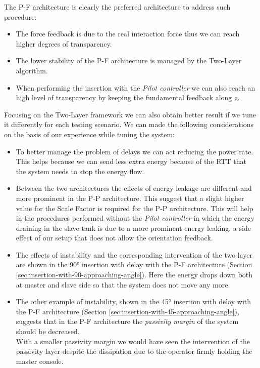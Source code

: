 The P-F architecture is clearly the preferred architecture to address such procedure:
\begin{itemize}
	\item The force feedback is due to the real interaction force thus we can reach higher degrees of transparency.
	\item The lower stability of the P-F architecture is managed by the Two-Layer algorithm.
	\item When performing the insertion with the \textit{Pilot controller} we can also reach an high level of transparency by keeping the fundamental feedback along $z$.
\end{itemize}
Focusing on the Two-Layer framework we can also obtain better result if we tune it differently for each testing scenario.
We can made the following considerations on the basis of our experience while tuning the system:
\begin{itemize}
	\item To better manage the problem of delays we can act reducing the power rate. This helps because we can send less extra energy because of the RTT that the system needs to stop the energy flow.
	\item Between the two architectures the effects of energy leakage are different and more prominent in the P-P architecture. This suggest that a slight higher value for the Scale Factor is required for the P-P architecture. This will help in the procedures performed without the \textit{Pilot controller} in which the energy draining in the slave tank is due to a more prominent energy leaking, a side effect of our setup that does not allow the orientation feedback.
	\item The effects of instability and the corresponding intervention of the two layer are shown in the 90° insertion with delay with the P-F architecture (Section \ref{sec:insertion-with-90-approaching-angle}). Here the energy drops down both at master and slave side so that the system does not move any more.
	\item  The other example of instability, shown in the 45° insertion with delay with the P-F architecture  (Section \ref{sec:insertion-with-45-approaching-angle}), suggests that in the P-F architecture the \textit{passivity margin} of the system should be decreased.\\
	With a smaller passivity margin we would have seen the intervention of the passivity layer despite the dissipation due to the operator firmly holding the master console.
\end{itemize}	


\clearpage
\thispagestyle{empty}